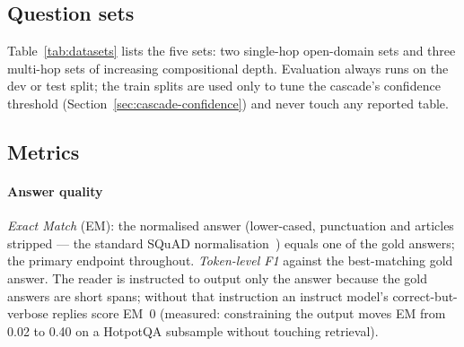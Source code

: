 \subsection{Question sets}
\label{sec:setup-datasets}

\begin{widetable}[t]
\caption{Question sets (FlashRAG splits). Recall ceiling is the mean
fraction of a question's gold articles present in the corpus at all
(Section~\ref{sec:setup-metrics}); NaturalQuestions and TriviaQA annotate
no gold documents.}
\label{tab:datasets}
\end{widetable}

Table~\ref{tab:datasets} lists the five sets: two single-hop open-domain
sets and three multi-hop sets of increasing compositional depth.
Evaluation always runs on the dev or test split; the train splits are used
only to tune the cascade's confidence threshold
(Section~\ref{sec:cascade-confidence}) and never touch any reported table.

\subsection{Metrics}
\label{sec:setup-metrics}

\paragraph{Answer quality} \emph{Exact Match} (EM): the normalised answer
(lower-cased, punctuation and articles stripped --- the standard SQuAD
normalisation~\citep{rajpurkar2016squad}) equals one of the gold answers;
the primary endpoint throughout. \emph{Token-level F1} against the best-matching gold answer.
The reader is instructed to output only the answer because the gold
answers are short spans; without that instruction an instruct model's
correct-but-verbose replies score EM~0 (measured: constraining the output
moves EM from 0.02 to 0.40 on a HotpotQA subsample without touching
retrieval).

